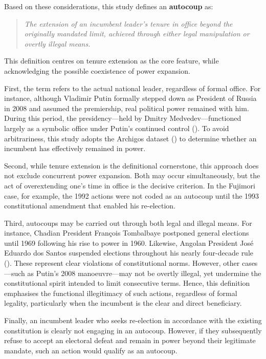 \documentclass[
  12pt,
]{report}
\begin{document}
Based on these considerations, this study defines an \textbf{autocoup}
as:

\begin{quote}
\emph{The extension of an incumbent leader's tenure in office beyond the
originally mandated limit, achieved through either legal manipulation or
overtly illegal means.}
\end{quote}

This definition centres on tenure extension as the core feature, while
acknowledging the possible coexistence of power expansion.

First, the term refers to the actual national leader, regardless of
formal office. For instance, although Vladimir Putin formally stepped
down as President of Russia in 2008 and assumed the premiership, real
political power remained with him. During this period, the
presidency---held by Dmitry Medvedev---functioned largely as a symbolic
office under Putin's continued control
(). To avoid arbitrariness, this
study adopts the Archigos dataset () to determine whether an incumbent has
effectively remained in power.

Second, while tenure extension is the definitional cornerstone, this
approach does not exclude concurrent power expansion. Both may occur
simultaneously, but the act of overextending one's time in office is the
decisive criterion. In the Fujimori case, for example, the 1992 actions
were not coded as an autocoup until the 1993 constitutional amendment
that enabled his re-election.

Third, autocoups may be carried out through both legal and illegal
means. For instance, Chadian President François Tombalbaye postponed
general elections until 1969 following his rise to power in 1960.
Likewise, Angolan President José Eduardo dos Santos suspended elections
throughout his nearly four-decade rule (). These represent clear violations of constitutional norms.
However, other cases---such as Putin's 2008 manoeuvre---may not be
overtly illegal, yet undermine the constitutional spirit intended to
limit consecutive terms. Hence, this definition emphasises the
functional illegitimacy of such actions, regardless of formal legality,
particularly when the incumbent is the clear and direct beneficiary.

Finally, an incumbent leader who seeks re-election in accordance with
the existing constitution is clearly not engaging in an autocoup.
However, if they subsequently refuse to accept an electoral defeat and
remain in power beyond their legitimate mandate, such an action would
qualify as an autocoup.
\end{document}
